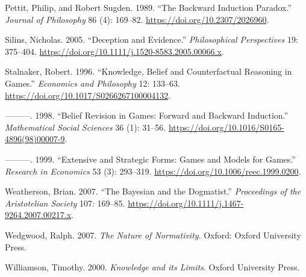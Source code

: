 \documentclass[
  11pt,
  letterpaper,
  DIV=11,
  numbers=noendperiod,
  oneside]{scrartcl}
\newlength{\cslhangindent}
\newenvironment{CSLReferences}[2] %
 {\begin{list}{}{%
  \setlength{\itemindent}{0pt}
  \setlength{\leftmargin}{0pt}
  \setlength{\parsep}{0pt}
  \ifodd #1
   \setlength{\leftmargin}{\cslhangindent}
   \setlength{\itemindent}{-1\cslhangindent}
  \fi
  \setlength{\itemsep}{#2\baselineskip}}}
 {\end{list}}
\begin{document}
\begin{CSLReferences}{1}{0}
Pettit, Philip, and Robert Sugden. 1989. {``The Backward Induction
Paradox.''} \emph{Journal of Philosophy} 86 (4): 169--82.
\url{https://doi.org/10.2307/2026960}.

Silins, Nicholas. 2005. {``Deception and Evidence.''}
\emph{Philosophical Perspectives} 19: 375--404.
\url{https://doi.org/10.1111/j.1520-8583.2005.00066.x}.

Stalnaker, Robert. 1996. {``Knowledge, Belief and Counterfactual
Reasoning in Games.''} \emph{Economics and Philosophy} 12: 133--63.
\url{https://doi.org/10.1017/S0266267100004132}.

---------. 1998. {``Belief Revision in Games: Forward and Backward
Induction.''} \emph{Mathematical Social Sciences} 36 (1): 31--56.
\url{https://doi.org/10.1016/S0165-4896(98)00007-9}.

---------. 1999. {``Extensive and Strategic Forms: Games and Models for
Games.''} \emph{Research in Economics} 53 (3): 293--319.
\url{https://doi.org/10.1006/reec.1999.0200}.

Weatherson, Brian. 2007. {``The Bayesian and the Dogmatist.''}
\emph{Proceedings of the Aristotelian Society} 107: 169--85.
\url{https://doi.org/10.1111/j.1467-9264.2007.00217.x}.

Wedgwood, Ralph. 2007. \emph{The Nature of Normativity}. Oxford: Oxford
University Press.

Williamson, Timothy. 2000. \emph{{Knowledge and its Limits}}. Oxford
University Press.

\end{CSLReferences}
\end{document}
